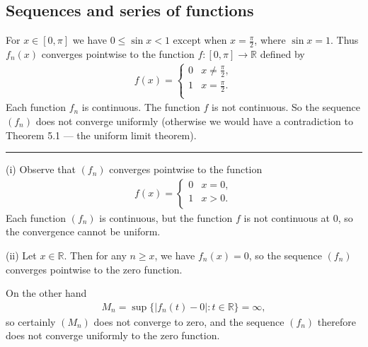 \documentclass[letterpaper,10pt,english]{jupyterBook}
\begin{document}
\subsection{Sequences and series of functions}
\label{\detokenize{Solutions-full:sequences-and-series-of-functions}}\label{\detokenize{Solutions-full:ch5sol}}
\sphinxAtStartPar
{\hyperref[\detokenize{Problems:id54}]{}} For \(x\in [0,\pi ]\) we have \(0\leq \sin x<1\) except when \(x=\frac{\pi}{2}\), where \(\sin x=1\). Thus \(f_n(x)\) converges pointwise to the function \(f\colon [0, \pi ]\rightarrow \mathbb{R}\) defined by
\begin{equation*}
\begin{split}
f(x) = \left\{ \begin{array}{ll}
0 & x\neq \frac{\pi}{2}, \\
1 & x=\frac{\pi}{2}. \\
\end{array} \right.
\end{split}
\end{equation*}
\sphinxAtStartPar
Each function \(f_n\) is continuous. The function \(f\) is not continuous. So the sequence \((f_n)\) does not converge uniformly (otherwise we would have a contradiction to Theorem 5.1 — the uniform limit theorem).


\bigskip\hrule\bigskip


\sphinxAtStartPar
{\hyperref[\detokenize{Problems:id55}]{}}
(i) Observe that \((f_n)\) converges pointwise to the function
\begin{equation*}
\begin{split}
f(x) = \left\{ \begin{array}{ll}
0 & x=0, \\
1 & x>0. \\
\end{array} \right.
\end{split}
\end{equation*}
\sphinxAtStartPar
Each function \((f_n)\) is continuous, but the function \(f\) is not continuous at \(0\), so the convergence cannot be uniform.

\sphinxAtStartPar
(ii) Let \(x\in \mathbb{R}\). Then for any \(n\geq x\), we have \(f_n (x) =0\), so the sequence \((f_n)\) converges pointwise to the zero function.

On the other hand
\begin{equation*}
\begin{split}
M_n = \sup \{ |f_n(t) -0| : t\in \mathbb{R} \} = \infty,
\end{split}
\end{equation*}
\sphinxAtStartPar
so certainly \((M_n)\) does not converge to zero, and the sequence \((f_n)\) therefore does not converge uniformly to the zero function.
\end{document}
